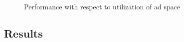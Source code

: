 \begin{figure}[h]
 	\qquad
  \caption{Performance with respect to utilization of ad space}%
  \label{fig:results1}%
\end{figure}



\subsection{Results}

